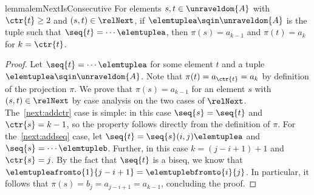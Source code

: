 \ifmainpart
\begin{restatable}{lemma}{lemNextIsConsecutive}\label{lem:next-is-consecutive}
For elements $s, t \in \unraveldom{A}$ with $\ctr{t} \ge 2$ and $(s,t) \in \relNext$, if $\elemtuplea \sqin \unraveldom{A}$ is the tuple such that $\seq{t} = \cdots \elemtuplea$, then $\pi(s) = a_{k-1}$ and $\pi(t) = a_{k}$ for $k = \ctr{t}$.
\end{restatable}
\fi
\ifmainpart
\begin{proof}
  Let $\seq{t} = \cdots{}\elemtuplea$ for some element $t$ and a tuple $\elemtuplea \sqin \unraveldom{A}$.
  Note that $\pi(t) = a_{\ctr{t}} = a_{k}$ by definition of the projection $\pi$.
  We prove that $\pi(s) = a_{k-1}$ for an element $s$ with $(s,t) \in \relNext$ by case analysis on the two cases of $\relNext$.
  The~\ref{next:addctr} case is simple: in this case $\seq{s} = \seq{t}$ and $\ctr{s} = k - 1$, so the property follows directly from the definition of $\pi$.
  For the~\ref{next:addseq} case, let $\seq{t} = \seq{s} (i,j) \elemtuplea$ and $\seq{s} = \cdots \elemtupleb$.
  Further, in this case $k = (j - i + 1) + 1$ and $\ctr{s} = j$.
  By the fact that $\seq{t}$ is a biseq, we know that $\elemtupleafromto{1}{j-i+1} = \elemtuplebfromto{i}{j}$.
  In particular, it follows that $\pi(s) = b_{j} = a_{j-i+1} = a_{k-1}$, concluding the proof.
\end{proof}
\fi
